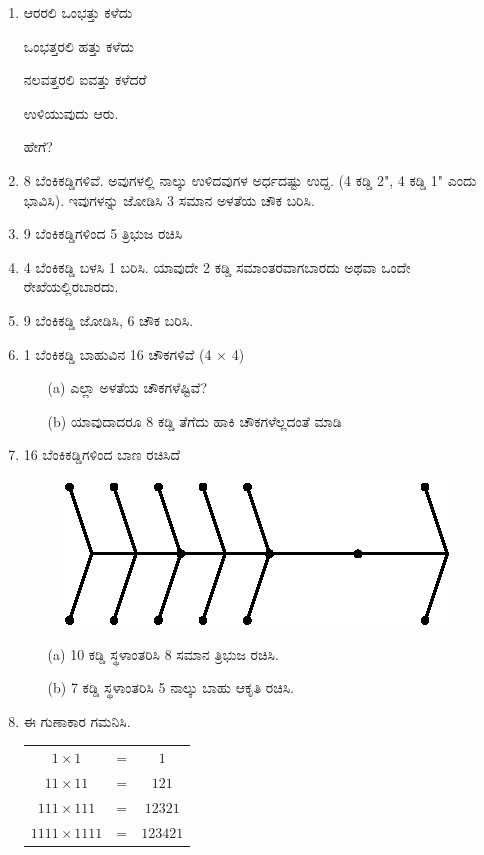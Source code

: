 \begin{enumerate}
\item ಆರರಲಿ ಒಂಭತ್ತು ಕಳೆದು 

ಒಂಭತ್ತರಲಿ ಹತ್ತು ಕಳೆದು 

ನಲವತ್ತರಲಿ ಐವತ್ತು ಕಳೆದರೆ 

ಉಳಿಯುವುದು ಆರು.

ಹೇಗೆ?

\item 8 ಬೆಂಕಿಕಡ್ಡಿಗಳಿವೆ. ಅವುಗಳಲ್ಲಿ ನಾಲ್ಕು ಉಳಿದವುಗಳ ಅರ್ಧದಷ್ಟು ಉದ್ದ. (4 ಕಡ್ಡಿ  2", 4 ಕಡ್ಡಿ 1" ಎಂದು ಭಾವಿಸಿ). ಇವುಗಳನ್ನು ಜೋಡಿಸಿ 3 ಸಮಾನ ಅಳತೆಯ ಚೌಕ ಬರಿಸಿ. 

\item 9 ಬೆಂಕಿಕಡ್ಡಿಗಳಿಂದ 5 ತ್ರಿಭುಜ ರಚಿಸಿ 

\item 4 ಬೆಂಕಿಕಡ್ಡಿ ಬಳಸಿ 1 ಬರಿಸಿ. ಯಾವುದೇ 2 ಕಡ್ಡಿ ಸಮಾಂತರವಾಗಬಾರದು ಅಥವಾ ಒಂದೇ ರೇಖೆಯಲ್ಲಿರಬಾರದು.

\item 9 ಬೆಂಕಿಕಡ್ಡಿ ಜೋಡಿಸಿ, 6 ಚೌಕ ಬರಿಸಿ.

\item 1 ಬೆಂಕಿಕಡ್ಡಿ ಬಾಹುವಿನ 16 ಚೌಕಗಳಿವೆ (4 $\times$ 4)
\begin{itemize}
\item[(a)] ಎಲ್ಲಾ ಅಳತೆಯ ಚೌಕಗಳೆಷ್ಟಿವೆ? 
\item[(b)] ಯಾವುದಾದರೂ 8 ಕಡ್ಡಿ ತೆಗೆದು ಹಾಕಿ ಚೌಕಗಳೆಲ್ಲದಂತೆ ಮಾಡಿ 
\end{itemize}

\item 16 ಬೆಂಕಿಕಡ್ಡಿಗಳಿಂದ ಬಾಣ ರಚಿಸಿದೆ 
\begin{figure}[H]
\centering
\includegraphics{images/chap4/q18.eps}
\end{figure}
\begin{itemize}
\item[(a)] 10 ಕಡ್ಡಿ ಸ್ಥಳಾಂತರಿಸಿ 8 ಸಮಾನ ತ್ರಿಭುಜ ರಚಿಸಿ.
\item[(b)] 7 ಕಡ್ಡಿ ಸ್ಥಳಾಂತರಿಸಿ 5 ನಾಲ್ಕು ಬಾಹು ಆಕೃತಿ ರಚಿಸಿ.
\end{itemize}

\item ಈ ಗುಣಾಕಾರ ಗಮನಿಸಿ.

\begin{tabular}[t]{ccc}
$1 \times 1$ & = & $1$\\
$11 \times 11$ & = & $121$\\
$111 \times 111$ & = & $12321$\\
$1111 \times 1111$ & = & $123421$
\end{tabular}


\end{enumerate}
